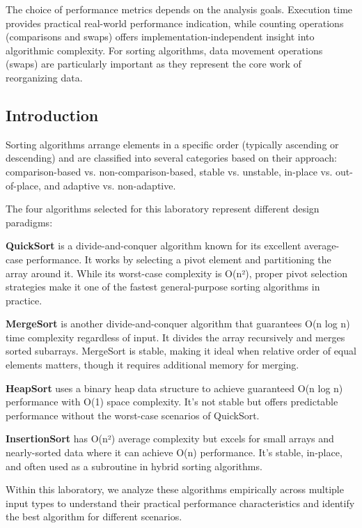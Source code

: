 \documentclass[12pt]{article}
\begin{document}
The choice of performance metrics depends on the analysis goals. Execution time provides practical real-world performance indication, while counting operations (comparisons and swaps) offers implementation-independent insight into algorithmic complexity. For sorting algorithms, data movement operations (swaps) are particularly important as they represent the core work of reorganizing data.

\subsection{Introduction}
\hspace{0.8cm} Sorting algorithms arrange elements in a specific order (typically ascending or descending) and are classified into several categories based on their approach: comparison-based vs. non-comparison-based, stable vs. unstable, in-place vs. out-of-place, and adaptive vs. non-adaptive.

The four algorithms selected for this laboratory represent different design paradigms:

\textbf{QuickSort} is a divide-and-conquer algorithm known for its excellent average-case performance. It works by selecting a pivot element and partitioning the array around it. While its worst-case complexity is O(n²), proper pivot selection strategies make it one of the fastest general-purpose sorting algorithms in practice.

\textbf{MergeSort} is another divide-and-conquer algorithm that guarantees O(n log n) time complexity regardless of input. It divides the array recursively and merges sorted subarrays. MergeSort is stable, making it ideal when relative order of equal elements matters, though it requires additional memory for merging.

\textbf{HeapSort} uses a binary heap data structure to achieve guaranteed O(n log n) performance with O(1) space complexity. It's not stable but offers predictable performance without the worst-case scenarios of QuickSort.

\textbf{InsertionSort} has O(n²) average complexity but excels for small arrays and nearly-sorted data where it can achieve O(n) performance. It's stable, in-place, and often used as a subroutine in hybrid sorting algorithms.

Within this laboratory, we analyze these algorithms empirically across multiple input types to understand their practical performance characteristics and identify the best algorithm for different scenarios.
\end{document}

